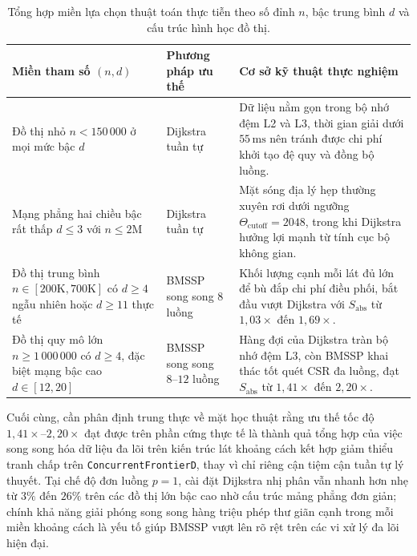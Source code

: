 \documentclass[12pt,a4paper,openany,oneside]{report}
\theoremstyle{plain}
\numberwithin{equation}{section}
\begin{document}
\begin{table}[!htb]
\centering
{\small\setlength{\tabcolsep}{5pt}\setlength{\baselineskip}{13.5pt}
\begin{tabularx}{\textwidth}{@{} >{\raggedright\arraybackslash}p{3.65cm} >{\raggedright\arraybackslash}p{2.75cm} >{\raggedright\arraybackslash}X @{}}
\toprule
\textbf{Miền tham số $(n, d)$} & \textbf{Phương pháp ưu thế} & \textbf{Cơ sở kỹ thuật thực nghiệm} \\
\midrule
Đồ thị nhỏ $n < 150\,000$ ở mọi mức bậc $d$ & Dijkstra tuần tự & Dữ liệu nằm gọn trong bộ nhớ đệm L2 và L3, thời gian giải dưới $55\,\mathrm{ms}$ nên tránh được chi phí khởi tạo đệ quy và đồng bộ luồng. \\
\addlinespace[5pt]
Mạng phẳng hai chiều bậc rất thấp $d \le 3$ với $n \le 2\mathrm{M}$ & Dijkstra tuần tự & Mặt sóng địa lý hẹp thường xuyên rơi dưới ngưỡng $\Theta_{\mathrm{cutoff}} = 2048$, trong khi Dijkstra hưởng lợi mạnh từ tính cục bộ không gian. \\
\addlinespace[5pt]
Đồ thị trung bình $n \in [200\mathrm{K}, 700\mathrm{K}]$ có $d \ge 4$ ngẫu nhiên hoặc $d \ge 11$ thực tế & BMSSP song song $8$ luồng & Khối lượng cạnh mỗi lát đủ lớn để bù đắp chi phí điều phối, bắt đầu vượt Dijkstra với $S_{\mathrm{abs}}$ từ $1{,}03\times$ đến $1{,}69\times$. \\
\addlinespace[5pt]
Đồ thị quy mô lớn $n \ge 1\,000\,000$ có $d \ge 4$, đặc biệt mạng bậc cao $d \in [12, 20]$ & BMSSP song song $8\text{--}12$ luồng & Hàng đợi của Dijkstra tràn bộ nhớ đệm L3, còn BMSSP khai thác tốt quét CSR đa luồng, đạt $S_{\mathrm{abs}}$ từ $1{,}41\times$ đến $2{,}20\times$. \\
\bottomrule
\end{tabularx}
}
\caption{Tổng hợp miền lựa chọn thuật toán thực tiễn theo số đỉnh $n$, bậc trung bình $d$ và cấu trúc hình học đồ thị.}
\label{tab:selection_guide}
\end{table}

Cuối cùng, cần phân định trung thực về mặt học thuật rằng ưu thế tốc độ $1{,}41\times$--$2{,}20\times$ đạt được trên phần cứng thực tế là thành quả tổng hợp của việc song song hóa dữ liệu đa lõi trên kiến trúc lát khoảng cách kết hợp giảm thiểu tranh chấp trên \texttt{Concurrent\allowbreak FrontierD}, thay vì chỉ riêng cận tiệm cận tuần tự lý thuyết. Tại chế độ đơn luồng $p = 1$, cài đặt Dijkstra nhị phân vẫn nhanh hơn nhẹ từ $3\%$ đến $26\%$ trên các đồ thị lớn bậc cao nhờ cấu trúc mảng phẳng đơn giản; chính khả năng giải phóng song song hàng triệu phép thư giãn cạnh trong mỗi miền khoảng cách là yếu tố giúp BMSSP vượt lên rõ rệt trên các vi xử lý đa lõi hiện đại.
\end{document}
